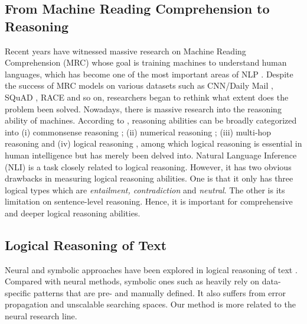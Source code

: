 \documentclass[11pt]{article}
\begin{document}
\subsection{From Machine Reading Comprehension to Reasoning} 
Recent years have witnessed massive research on Machine Reading Comprehension (MRC) whose goal is training machines to understand human languages, which has become one of the most important areas of NLP \citep{chen2016thorough,sachan2016machine,Seo2016Bidirectional,dhingra2017gated,Cui2017Attention,song2018exploring,hu2019read,zhang2019sg,back2020neurquri,zhang2020retrospective}. Despite the success of MRC models on various datasets such as CNN/Daily Mail \citep{hermann2015teaching}, SQuAD \citep{rajpurkar-etal-2016-squad}, RACE \citep{lai-etal-2017-race} and so on, researchers began to rethink what extent does the problem been solved. Nowadays, there is massive research into the reasoning ability of machines. According to \citep{kaushik-lipton-2018-much, ZHOU2020275, chen-etal-2016-thorough}, reasoning abilities can be broadly categorized into (i) commonsense reasoning \citep{davis2015commonsense,bhagavatula2019abductive,talmor2019commonsenseqa,huang2019cosmos}; (ii) numerical reasoning \citep{dua2019drop}; (iii) multi-hop reasoning \citep{yang2018hotpotqa} and (iv) logical reasoning \citep{yu2020reclor,ijcai2020-0501}, among which logical reasoning is essential in human intelligence but has merely been delved into. Natural Language Inference (NLI) \citep{bowman2015large,williams2018broad,nie2020adversarial} is a task closely related to logical reasoning. However, it has two obvious drawbacks in measuring logical reasoning abilities. One is that it only has three logical types which are \textit{entailment, contradiction} and \textit{neutral}. The other is its limitation on sentence-level reasoning. Hence, it is important for comprehensive and deeper logical reasoning abilities.





\subsection{Logical Reasoning of Text}
Neural and symbolic approaches have been explored in logical reasoning of text \cite{garcez2015neural, garcez2022neural, ren2020beta}. Compared with neural methods, symbolic ones such as \cite{wang2021logic} heavily rely on data-specific patterns that are pre- and manually defined. It also suffers from error propagation and unscalable searching spaces. Our method is more related to the neural research line. 
\end{document}
